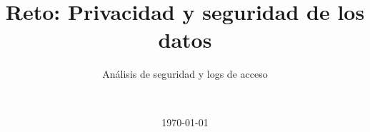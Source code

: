 \titlehead{\centering Instituto Tecnológico y de Estudios Superiores de Monterrey}
\subject{Inteligencia artificial avanzada para la ciencia de datos}
\title{Reto: Privacidad y seguridad de los datos}
\subtitle{Análisis de seguridad y logs de acceso}
\author{\alumno \\ \matricula}
\date{\today}

\maketitle
